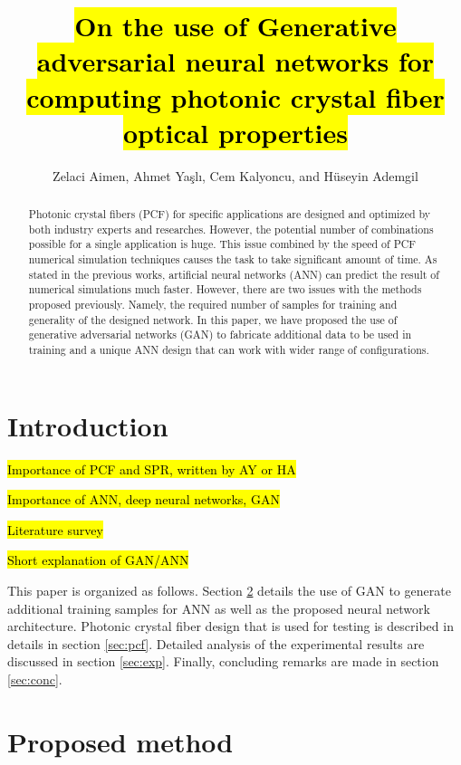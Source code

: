 \documentclass[draft, a4, 10pt, onecolumn]{IEEEtran}
\begin{document}
\title{\hl{On the use of Generative adversarial neural networks for computing photonic crystal fiber optical properties}}

\author{Zelaci Aimen, Ahmet Yaşlı, Cem Kalyoncu, and Hüseyin Ademgil}

\maketitle
	
\begin{abstract}
Photonic crystal fibers (PCF) for specific applications are designed and optimized by both industry experts and researches. However, the potential number of combinations possible for a single application is huge. This issue combined by the speed of PCF numerical simulation techniques causes the task to take significant amount of time. As stated in the previous works, artificial neural networks (ANN) can predict the result of numerical simulations much faster. However, there are two issues with the methods proposed previously. Namely, the required number of samples for training and generality of the designed network. In this paper, we have proposed the use of generative adversarial networks (GAN) to fabricate additional data to be used in training and a unique ANN design that can work with wider range of configurations.
\end{abstract}

\section{Introduction}

\hl{Importance of PCF and SPR, written by AY or HA}

\hl{Importance of ANN, deep neural networks, GAN}

\hl{Literature survey}

\hl{Short explanation of GAN/ANN}

This paper is organized as follows. Section \ref{sec:prop} details the use of GAN to generate additional training samples for ANN as well as the proposed neural network architecture. Photonic crystal fiber design that is used for testing is described in details in section \ref{sec:pcf}. Detailed analysis of the experimental results are discussed in section \ref{sec:exp}. Finally, concluding remarks are made in section \ref{sec:conc}.

\section{Proposed method}
\label{sec:prop}
\end{document}
